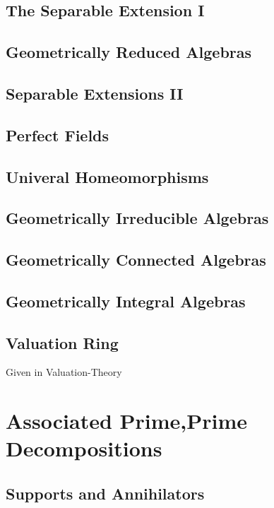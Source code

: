 \documentclass[Total.tex]{subfiles}
\begin{document}
		\section{The Separable Extension I}
		\section{Geometrically Reduced Algebras}
		\section{Separable Extensions II}
		\section{Perfect Fields}
		\section{Univeral Homeomorphisms}
		\section{Geometrically Irreducible Algebras}
		\section{Geometrically Connected Algebras}
		\section{Geometrically Integral Algebras}
		\section{Valuation Ring}
			Given in Valuation-Theory
	\chapter{Associated Prime,Prime Decompositions}
		\section{Supports and Annihilators}
\end{document}
